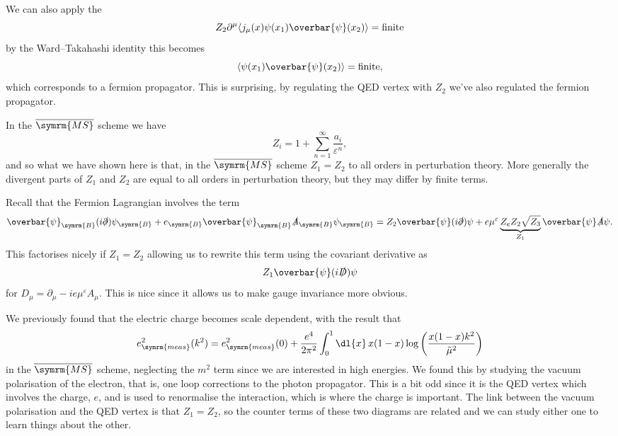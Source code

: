 \documentclass[fleqn]{NotesClass}
\newcommand{\MSbar}{\ensuremath{\overline{\symrm{MS}}}}
\newcommand{\diracadjoint}[1]{\overbar{#1}}
\newcommand{\covariantDerivative}{D}
\DeclarePairedDelimiter{\correlator}{\langle}{\rangle}
\newcommand{\bare}{\symrm{B}}
\newcommand{\measured}{\symrm{meas}}
\begin{document}
    We can also apply the 
    \begin{equation}
        Z_2\partial^\mu\correlator{j_\mu(x) \psi(x_1) \diracadjoint{\psi}(x_2)} = \text{finite}
    \end{equation}
    by the Ward--Takahashi identity this becomes
    \begin{equation}
        \correlator{\psi(x_1) \diracadjoint{\psi}(x_2)} = \text{finite},
    \end{equation}
    which corresponds to a fermion propagator.
    This is surprising, by regulating the QED vertex with \(Z_2\) we've also regulated the fermion propagator.
    
    In the \MSbar{} scheme we have
    \begin{equation}
        Z_i = 1 + \sum_{n = 1}^{\infty} \frac{a_i}{\varepsilon^n},
    \end{equation}
    and so what we have shown here is that, in the \MSbar{} scheme \(Z_1 = Z_2\) to all orders in perturbation theory.
    More generally the divergent parts of \(Z_1\) and \(Z_2\) are equal to all orders in perturbation theory, but they may differ by finite terms.
    
    Recall that the Fermion Lagrangian involves the term
    \begin{equation}
        \diracadjoint{\psi}_{\bare}(i\slashed{\partial})\psi_{\bare} + e_{\bare}\diracadjoint{\psi}_{\bare}\slashed{A}_{\bare}\psi_{\bare} = Z_2\diracadjoint{\psi}(i\slashed{\partial})\psi + e\mu^\varepsilon \underbrace{Z_eZ_2\sqrt{Z_3}}_{Z_1} \diracadjoint{\psi}\slashed{A}\psi.
    \end{equation}
    This factorises nicely if \(Z_1 = Z_2\) allowing us to rewrite this term using the covariant derivative as
    \begin{equation}
        Z_1\diracadjoint{\psi}(i\slashed{\covariantDerivative})\psi
    \end{equation}
    for \(\covariantDerivative_\mu = \partial_\mu - ie\mu^\varepsilon A_\mu\).
    This is nice since it allows us to make gauge invariance more obvious.
    
    We previously found that the electric charge becomes scale dependent, with the result that
    \begin{equation}
        e_{\measured}^2(k^2) = e_{\measured}^2(0) + \frac{e^4}{2\pi^2} \int_0^1 \dl{x} \, x(1 - x) \log\left( \frac{x(1 - x)k^2}{\tilde{\mu}^2} \right)
    \end{equation}
    in the \MSbar{} scheme, neglecting the \(m^2\) term since we are interested in high energies.
    We found this by studying the vacuum polarisation of the electron, that is, one loop corrections to the photon propagator.
    This is a bit odd since it is the QED vertex which involves the charge, \(e\), and is used to renormalise the interaction, which is where the charge is important.
    The link between the vacuum polarisation and the QED vertex is that \(Z_1 = Z_2\), so the counter terms of these two diagrams are related and we can study either one to learn things about the other.
    
\end{document}
